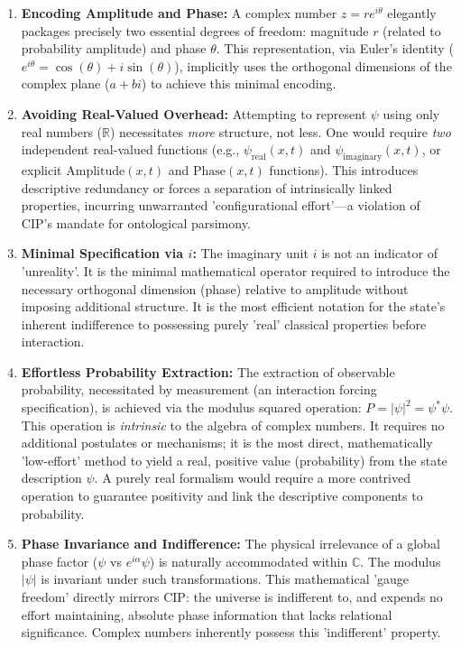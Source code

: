 \documentclass[11pt, a4paper]{article}
\newcommand{\subt}[1]{\mathrm{#1}}
\begin{document}
\begin{enumerate}
    \item \textbf{Encoding Amplitude and Phase:} A complex number $z = r e^{i\theta}$ elegantly packages precisely two essential degrees of freedom: magnitude $r$ (related to probability amplitude) and phase $\theta$. This representation, via Euler's identity ($e^{i\theta} = \cos(\theta) + i \sin(\theta)$), implicitly uses the orthogonal dimensions of the complex plane ($a + bi$) to achieve this minimal encoding.

    \item \textbf{Avoiding Real-Valued Overhead:} Attempting to represent $\psi$ using only real numbers ($\mathbb{R}$) necessitates \textit{more} structure, not less. One would require \textit{two} independent real-valued functions (e.g., $\psi_{\subt{real}}(x,t)$ and $\psi_{\subt{imaginary}}(x,t)$, or explicit $\mathrm{Amplitude}(x,t)$ and $\mathrm{Phase}(x,t)$ functions). This introduces descriptive redundancy or forces a separation of intrinsically linked properties, incurring unwarranted 'configurational effort'—a violation of CIP's mandate for ontological parsimony.

    \item \textbf{Minimal Specification via $i$:} The imaginary unit $i$ is not an indicator of 'unreality'. It is the minimal mathematical operator required to introduce the necessary orthogonal dimension (phase) relative to amplitude without imposing additional structure. It is the most efficient notation for the state's inherent indifference to possessing purely 'real' classical properties before interaction.

    \item \textbf{Effortless Probability Extraction:} The extraction of observable probability, necessitated by measurement (an interaction forcing specification), is achieved via the modulus squared operation: $P = |\psi|^2 = \psi^*\psi$. This operation is \textit{intrinsic} to the algebra of complex numbers. It requires no additional postulates or mechanisms; it is the most direct, mathematically 'low-effort' method to yield a real, positive value (probability) from the state description $\psi$. A purely real formalism would require a more contrived operation to guarantee positivity and link the descriptive components to probability.

    \item \textbf{Phase Invariance and Indifference:} The physical irrelevance of a global phase factor ($\psi$ vs $e^{i\alpha}\psi$) is naturally accommodated within $\mathbb{C}$. The modulus $|\psi|$ is invariant under such transformations. This mathematical 'gauge freedom' directly mirrors CIP: the universe is indifferent to, and expends no effort maintaining, absolute phase information that lacks relational significance. Complex numbers inherently possess this 'indifferent' property.


\end{enumerate}
\end{document}
